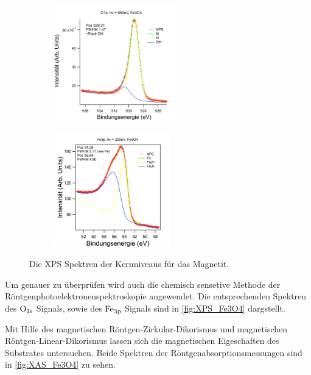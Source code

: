         \begin{figure}
            \centering
            \begin{subfigure}[t]{0.48\textwidth}
                \centering
                \includegraphics[height=5cm]{./content/pictures/Fe3O4/O1s_Fe3O4.png}
                \label{fig:XPSO1s_Fe3O4}
            \end{subfigure}
            \begin{subfigure}[t]{0.48\textwidth}
                \centering
                \includegraphics[height=5cm]{./content/pictures/Fe3O4/Fe3p_Fe3O4.png}
                \label{fig:XPSFe3p_Fe3O4}
            \end{subfigure}
            \caption{Die XPS Spektren der Kernniveaus für das Magnetit.}
            \label{fig:XPS_Fe3O4}
        \end{figure}
        Um genauer zu überprüfen wird auch die chemisch sensetive Methode der Röntgenphotoelektronenspektroskopie angewendet.
        Die entsprechenden Spektren des $\ce{O}_{1\text{s}}$ Signals, sowie des $\ce{Fe}_{3\text{p}}$ Signals sind in \autoref{fig:XPS_Fe3O4} dargstellt.

        Mit Hilfe des magnetischen Röntgen-Zirkular-Dikorismus und magnetischen Röntgen-Linear-Dikorismus lassen sich die magnetischen Eigeschaften des Substrates untersuchen.
        Beide Spektren der Röntgenabsorptionsmessungen sind in \autoref{fig:XAS_Fe3O4} zu sehen.

